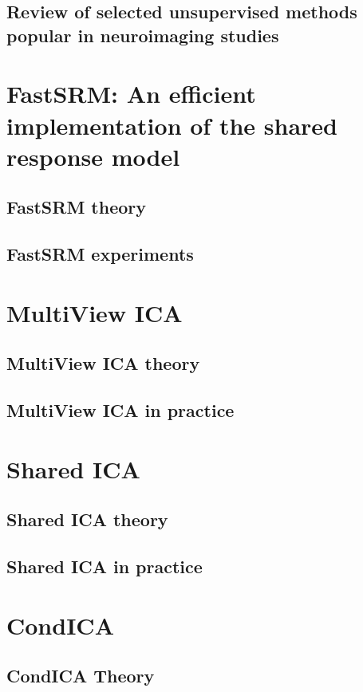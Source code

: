 \documentclass[ twoside,openright,titlepage,numbers=noenddot,%
                headinclude,footinclude,cleardoublepage=empty,abstract=on,
                BCOR=5mm,paper=a4,fontsize=11pt, 
                ]{scrreprt}
\begin{document}
\chapter{Review of selected unsupervised methods popular in neuroimaging studies}
\label{ch:review}

\part{FastSRM: An efficient implementation of the shared response model}
\label{part:fastsrm}
\chapter{FastSRM theory}
\label{ch:fastsrm1}

\chapter{FastSRM experiments}
\label{ch:fastsrm2}

\part{MultiView ICA}
\label{part:mvica}
\chapter{MultiView ICA theory}
\label{ch:mvica1}

\chapter{MultiView ICA in practice}
\label{ch:mvica2}

\part{Shared ICA}
\label{part:shica}
\chapter{Shared ICA theory}
\label{ch:shica}

\chapter{Shared ICA in practice}
\label{ch:shica2}

\part{CondICA}
\label{part:condica}
\chapter{CondICA Theory}
\label{ch:condica}

\end{document}
